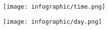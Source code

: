 \documentclass[runningheads]{llncs}
\begin{document}
\begin{appendix}
\begin{figure}
\end{figure}

\begin{figure}
    \centering
    \texttt{[image: infographic/time.png]}
    
\end{figure}

\begin{figure}
    \centering
    \texttt{[image: infographic/day.png]}
    
\end{figure}

\end{appendix}
\end{document}
